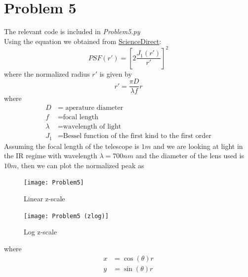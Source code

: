 \documentclass[20pt,letterpaper]{article}
\begin{document}
\section{Problem 5}
The relevant code is included in \textit{Problem5.py}\\
Using the equation we obtained from \href{https://www.sciencedirect.com/topics/engineering/airy-disk}{ScienceDirect}:
\begin{equation*}
	PSF (r') = [2\frac{J_1(r')}{r'}]^2
\end{equation*}
where the normalized radius $r'$ is given by 
\begin{equation*}
	r' = \frac{\pi D}{\lambda f}r
\end{equation*}
where
\begin{align*}
	D &= \text{ aperature diameter} \\
	f &= \text{focal length} \\
	\lambda &= \text{wavelength of light} \\
	J_1 &= \text{Bessel function of the first kind to the first order}
\end{align*}
Assuming the focal length of the telescope is $1 m$ and we are looking at light in the IR regime with wavelength $\lambda = 700 nm$ and the diameter of the lens used is $ 10 m$, then we can plot the normalized peak as
\begin{figure}[h]
	\texttt{[image: Problem5]}
	\caption{Linear z-scale}
\end{figure}
\begin{figure}[h]
	\texttt{[image: Problem5 (zlog)]}
	\caption{Log z-scale}
\end{figure}
where 
\begin{align*}
	x &= \cos(\theta)r \\
	y&= \sin(\theta)r
\end{align*}
\end{document}
